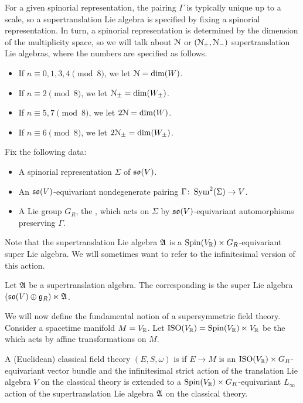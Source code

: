 \documentclass[10pt, oneside]{article}
\begin{document}
For a given spinorial representation, the pairing $\Gamma$ is typically unique up to a scale, so a supertranslation Lie algebra is specified by fixing a spinorial representation. In turn, a spinorial representation is determined by the dimension of the multiplicity space, so we will talk about $\mathcal{N}$ or $(\mathcal{N}_+, \mathcal{N}_-)$ supertranslation Lie algebras, where the numbers are specified as follows.
\begin{itemize}
\item If $n\equiv 0, 1, 3, 4\pmod 8$, we let $\mathcal{N} = \dim(W)$.

\item If $n\equiv 2 \pmod 8$, we let $\mathcal{N}_{\pm}=\dim(W_{\pm})$.

\item If $n\equiv 5, 7\pmod 8$, we let $2\mathcal{N} = \dim(W)$.

\item If $n\equiv 6\pmod 8$, we let $2\mathcal{N}_{\pm} = \dim(W_{\pm})$.
\end{itemize}

Fix the following data:
\begin{itemize}
\item A spinorial representation $\Sigma$ of $\mathfrak{so}(V)$.

\item An $\mathfrak{so}(V)$-equivariant nondegenerate pairing $\Gamma\colon \operatorname{Sym}^2(\Sigma)\rightarrow V$.

\item A Lie group $G_R$, the , which acts on $\Sigma$ by $\mathfrak{so}(V)$-equivariant automorphisms preserving $\Gamma$.
\end{itemize}

Note that the supertranslation Lie algebra $\mathfrak A$ is a $\mathrm{Spin}(V_\mathbb R)\times G_R$-equivariant super Lie algebra.  We will sometimes want to refer to the infinitesimal version of this action.
\begin{definition}
Let $\mathfrak A$ be a supertranslation algebra.  The corresponding  is the super Lie algebra $(\mathfrak{so}(V) \oplus \mathfrak{g}_R) \ltimes \mathfrak A$.
\end{definition}

We will now define the fundamental notion of a supersymmetric field theory.  Consider a spacetime manifold $M=V_\mathbb R$. Let $\mathrm{ISO}(V_\mathbb R) = \mathrm{Spin}(V_\mathbb R)\ltimes V_\mathbb R$ be the  which acts by affine transformations on $M$.

\begin{definition}
\label{dfn: super}
A (Euclidean) classical field theory $(E, S, \omega)$ is  if $E\rightarrow M$ is an $\mathrm{ISO}(V_\mathbb R)\times G_R$-equivariant vector bundle and the infinitesimal strict action of the translation Lie algebra $V$ on the classical theory is extended to a $\mathrm{Spin}(V_\mathbb R)\times G_R$-equivariant $L_\infty$ action of the supertranslation Lie algebra $\mathfrak A$ on the classical theory.
\end{definition}
\end{document}
